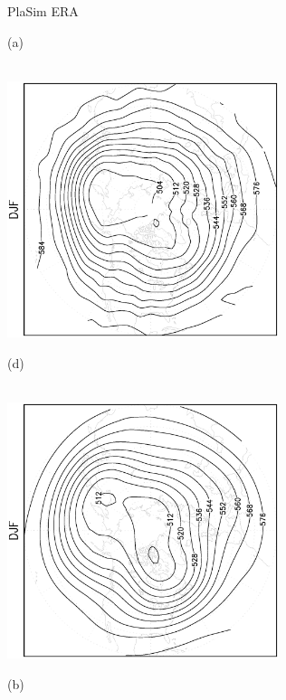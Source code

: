 \documentclass[12pt,a4paper,twoside,openright,headinclude,liststotoc,bibtotoc]{scrreprt}
\begin{document}
\begin{appendix}
\begin{figure}[c]
\hspace{3.55cm}PlaSim \vspace{0.2cm} \hspace{7.25cm} ERA \\
\parbox{8.5cm}{\hspace{0.90cm}\begin{scriptsize}(a) \end{scriptsize} \vspace{-0.5cm} \\
\includegraphics[height=7.5cm,angle=-90]
{eps/northcircysmz500DJF.eps}
}
\parbox{8.5cm}{\hspace{0.90cm}\begin{scriptsize}(d) \end{scriptsize} \vspace{-0.5cm} \\
\includegraphics[height=7.5cm,angle=-90]
{eps/northcirct21ysmz500DJF.eps}
}
\parbox{8.5cm}{\hspace{0.80cm} \begin{scriptsize}(b) \end{scriptsize} \vspace{-0.5cm} \\
}
\end{figure}
\end{appendix}
\end{document}
